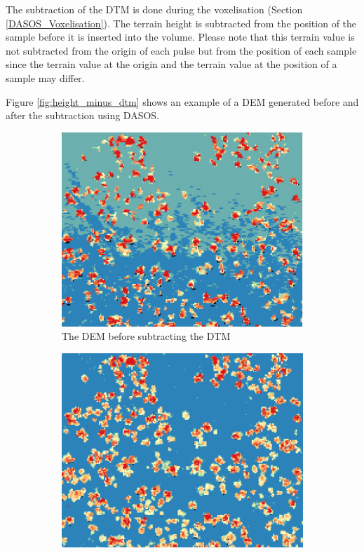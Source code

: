 \documentclass{subfiles}
\begin{document}
\par The subtraction of the DTM is done during the voxelisation (Section \ref{DASOS_Voxelisation}). The terrain height is subtracted from the position of the sample before it is inserted into the volume. Please note that this terrain value is not subtracted from the origin of each pulse but from the position of each sample since the terrain value at the origin and the terrain value at the position of a sample may differ. 
\par Figure \ref{fig:height_minus_dtm} shows an example of a DEM generated before and after the subtraction using DASOS. 


\begin{figure} [h!]			
	\begin{subfigure}[t]{.49\textwidth}
		
		\centering
		\includegraphics[width=\textwidth]{img/dead/height}
		\caption{The DEM before subtracting the DTM}
		\label{fig:height}
	\end{subfigure} \hfill
	\begin{subfigure}[t]{.49\textwidth}
		\centering
		\includegraphics[width=\textwidth]{img/dead/height_dtm}

\end{subfigure}
\end{figure}
\end{document}
